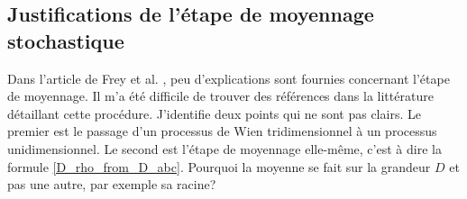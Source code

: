 \documentclass[openany,a4paper,12pt]{article}
\begin{document}
\subsection*{Justifications de l'étape de moyennage stochastique}

\par Dans l'article de Frey et al. \cite{frey2012}, peu d'explications sont fournies concernant l'étape de moyennage. Il m'a été difficile de trouver des références dans la littérature détaillant cette procédure. J'identifie deux points qui ne sont pas clairs. Le premier est le passage d'un processus de Wien tridimensionnel à un processus unidimensionnel. Le second est l'étape de moyennage elle-même, c'est à dire la formule \ref{D_rho_from_D_abc}. Pourquoi la moyenne se fait sur la grandeur $D$ et pas une autre, par exemple sa racine?
\end{document}
